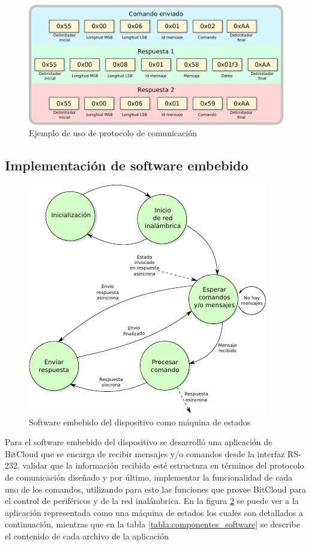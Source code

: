  
\begin{figure}
	\centering
	\includegraphics[scale=0.3]{capitulo_3_imgs/protocolo_ejemplo_1.pdf}
	\caption{Ejemplo de uso de protocolo de comunicación}
	\label{fig:protocolo_ejemplo}
\end{figure}

\subsection{Implementación de software embebido}

\begin{figure}
	\centering
	\includegraphics[scale=1.2]{capitulo_3_imgs/app_sd.pdf}
	\caption{Software embebido del dispositivo como máquina de estados}
	\label{fig:maquina_estados_sd}
\end{figure}

Para el software embebido del dispositivo se desarrolló una aplicación de BitCloud que se encarga de recibir mensajes y/o comandos desde la interfaz RS-232, validar que la información recibida esté estructura en términos del protocolo de comunicación diseñado y por último, implementar la funcionalidad de cada uno de los comandos, utilizando para esto las funciones que provee BitCloud para el control de periféricos y de la red inalámbrica. En la figura \ref{fig:maquina_estados_sd} se puede ver a la aplicación representada como una máquina de estados los cuales son detallados a continuación, mientras que en la tabla \ref{tabla:componentes_software} se describe el contenido de cada archivo de la aplicaci\'on

